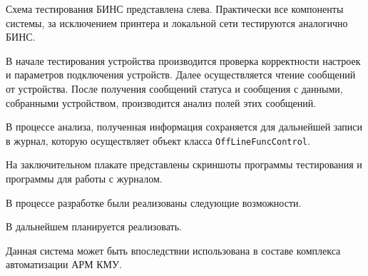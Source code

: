 Схема тестирования БИНС представлена слева. Практически все компоненты системы, за исключением принтера и локальной сети
тестируются аналогично БИНС.

В начале тестирования устройства производится проверка корректности настроек и параметров подключения устройств. Далее
осуществляется чтение сообщений от устройства. После получения сообщений статуса и сообщения с данными, собранными
устройством, производится анализ полей этих сообщений.

В процессе анализа, полученная информация сохраняется для дальнейшей записи в журнал, которую осуществляет объект класса
\texttt{OffLineFuncControl}.

На заключительном плакате представлены скриншоты программы тестирования и программы для работы с журналом.

В процессе разработке были реализованы следующие возможности.

В дальнейшем планируется реализовать.

Данная система может быть впоследствии использована в составе комплекса автоматизации АРМ КМУ.
